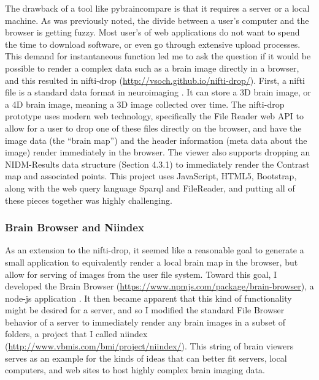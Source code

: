 \documentclass{report}
\begin{document}
The drawback of a tool like pybraincompare is that it requires a server
or a local machine. As was previously noted, the divide between a user's
computer and the browser is getting fuzzy. Most user's of web
applications do not want to spend the time to download software, or even
go through extensive upload processes. This demand for instantaneous
function led me to ask the question if it would be possible to render a
complex data such as a brain image directly in a browser, and this
resulted in nifti-drop
(\href{http://vsoch.github.io/nifti-drop/}{http://vsoch.github.io/nifti-drop/}).
First, a nifti file is a standard data format in neuroimaging \cite{Mjenkinson2005-hk}.
It can store a 3D brain image, or a 4D brain image, meaning a 3D image
collected over time. The nifti-drop prototype uses modern web
technology, specifically the File Reader web API \cite{noauthor_undated-fz} to
allow for a user to drop one of these files directly on the browser, and
have the image data (the ``brain map'') and the header information (meta
data about the image) render immediately in the browser. The viewer also
supports dropping an NIDM-Results data structure (Section 4.3.1) to
immediately render the Contrast map and associated points. This project
uses JavaScript, HTML5, Bootstrap, along with the web query language
Sparql and FileReader, and putting all of these pieces together was
highly challenging.

\subsubsection{Brain Browser and Niindex}

As an extension to the nifti-drop, it seemed like a reasonable goal to
generate a small application to equivalently render a local brain map in
the browser, but allow for serving of images from the user file system.
Toward this goal, I developed the Brain Browser
(\href{https://www.npmjs.com/package/brain-browser}{https://www.npmjs.com/package/brain-browser}), a node-js application \cite{Foundation_undated-ud}.
It then became apparent that this kind of functionality might be desired
for a server, and so I modified the standard File Browser behavior of a
server to immediately render any brain images in a subset of folders, a
project that I called niindex
(\href{http://www.vbmis.com/bmi/project/niindex/}{http://www.vbmis.com/bmi/project/niindex/}). This string of brain viewers serves as an example for the kinds of ideas that can better fit
servers, local computers, and web sites to host highly complex brain
imaging data.
\end{document}
